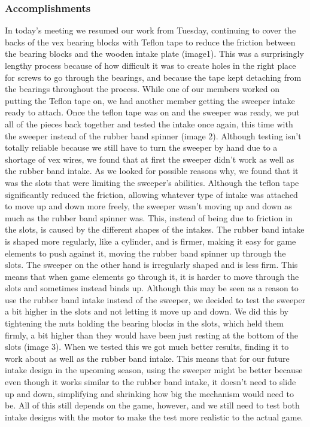 \subsubsection*{Accomplishments}
In today’s meeting we resumed our work from Tuesday, continuing to cover the backs of the vex bearing blocks with Teflon tape to reduce the friction between the bearing blocks and the wooden intake plate (image1). This was a surprisingly lengthy process because of how difficult it was to create holes in the right place for screws to go through the bearings, and because the tape kept detaching from the bearings throughout the process.
While one of our members worked on putting the Teflon tape on, we had another member getting the sweeper intake ready to attach. Once the teflon tape was on and the sweeper was ready, we put all of the pieces back together and tested the intake once again, this time with the sweeper instead of the rubber band spinner (image 2). Although testing isn’t totally reliable because we still have to turn the sweeper by hand due to a shortage of vex wires, we found that at first the sweeper didn’t work as well as the rubber band intake. As we looked for possible reasons why, we found that it was the slots that were limiting the sweeper’s abilities. Although the teflon tape significantly reduced the friction, allowing whatever type of intake was attached to move up and down more freely, the sweeper wasn’t moving up and down as much as the rubber band spinner was. This, instead of being due to friction in the slots, is caused by the different shapes of the intakes. The rubber band intake is shaped more regularly, like a cylinder, and is firmer, making it easy for game elements to push against it, moving the rubber band spinner up through the slots. The sweeper on the other hand is irregularly shaped and is less firm. This means that when game elements go through it, it is harder to move through the slots and sometimes instead binds up.
Although this may be seen as a reason to use the rubber band intake instead of the sweeper, we decided to test the sweeper a bit higher in the slots and not letting it move up and down. We did this by tightening the nuts holding the bearing blocks in the slots, which held them firmly, a bit higher than they would have been just resting at the bottom of the slots (image 3). When we tested this we got much better results, finding it to work about as well as the rubber band intake. This means that for our future intake design in the upcoming season, using the sweeper might be better because even though it works similar to the rubber band intake, it doesn't need to slide up and down, simplifying and shrinking how big the mechanism would need to be. All of this still depends on the game, however, and we still need to test both intake designs with the motor to make the test more realistic to the actual game.



